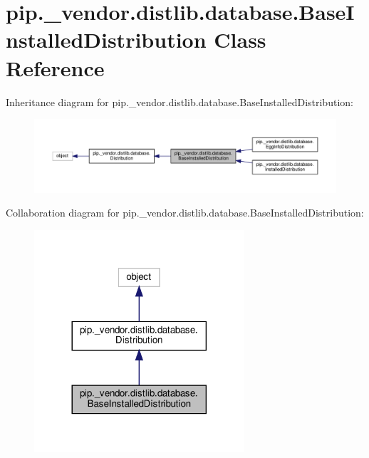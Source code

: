 \hypertarget{classpip_1_1__vendor_1_1distlib_1_1database_1_1BaseInstalledDistribution}{}\section{pip.\+\_\+vendor.\+distlib.\+database.\+Base\+Installed\+Distribution Class Reference}
\label{classpip_1_1__vendor_1_1distlib_1_1database_1_1BaseInstalledDistribution}


Inheritance diagram for pip.\+\_\+vendor.\+distlib.\+database.\+Base\+Installed\+Distribution\+:
\nopagebreak
\begin{figure}[H]
\begin{center}
\leavevmode
\includegraphics[width=350pt]{classpip_1_1__vendor_1_1distlib_1_1database_1_1BaseInstalledDistribution__inherit__graph}
\end{center}
\end{figure}


Collaboration diagram for pip.\+\_\+vendor.\+distlib.\+database.\+Base\+Installed\+Distribution\+:
\nopagebreak
\begin{figure}[H]
\begin{center}
\leavevmode
\includegraphics[width=221pt]{classpip_1_1__vendor_1_1distlib_1_1database_1_1BaseInstalledDistribution__coll__graph}
\end{center}
\end{figure}
